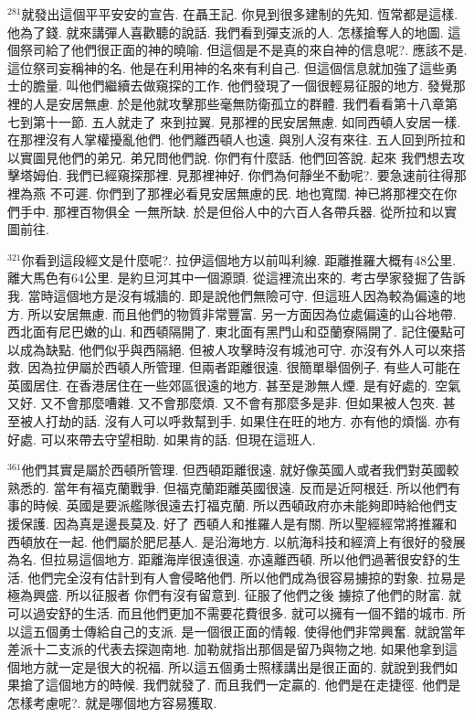 \documentclass{book}
\begin{document}
$^{281}$就發出這個平平安安的宣告.
在聶王記.
你見到很多建制的先知.
恆常都是這樣.
他為了錢.
就來講彈人喜歡聽的說話.
我們看到彈支派的人.
怎樣搶奪人的地圖.
這個祭司給了他們很正面的神的曉喻.
但這個是不是真的來自神的信息呢?.
應該不是.
這位祭司妄稱神的名.
他是在利用神的名來有利自己.
但這個信息就加強了這些勇士的膽量.
叫他們繼續去做窺探的工作.
他們發現了一個很輕易征服的地方.
發覺那裡的人是安居無慮.
於是他就攻擊那些毫無防衛孤立的群體.
我們看看第十八章第七到第十一節.
五人就走了 來到拉翼.
見那裡的民安居無慮.
如同西頓人安居一樣.
在那裡沒有人掌權擾亂他們.
他們離西頓人也遠.
與別人沒有來往.
五人回到所拉和以實圖見他們的弟兄.
弟兄問他們說.
你們有什麼話.
他們回答說.
起來 我們想去攻擊塔姆伯.
我們已經窺探那裡.
見那裡神好.
你們為何靜坐不動呢?.
要急速前往得那裡為燕 不可遲.
你們到了那裡必看見安居無慮的民.
地也寬闊.
神已將那裡交在你們手中.
那裡百物俱全 一無所缺.
於是但俗人中的六百人各帶兵器.
從所拉和以實圖前往.

$^{321}$你看到這段經文是什麼呢?.
拉伊這個地方以前叫利線.
距離推羅大概有48公里.
離大馬色有64公里.
是約旦河其中一個源頭.
從這裡流出來的.
考古學家發掘了告訴我.
當時這個地方是沒有城牆的.
即是說他們無險可守.
但這班人因為較為偏遠的地方.
所以安居無慮.
而且他們的物質非常豐富.
另一方面因為位處偏遠的山谷地帶.
西北面有尼巴嫩的山.
和西頓隔開了.
東北面有黑門山和亞蘭寮隔開了.
記住優點可以成為缺點.
他們似乎與西隔絕.
但被人攻擊時沒有城池可守.
亦沒有外人可以來搭救.
因為拉伊屬於西頓人所管理.
但兩者距離很遠.
很簡單舉個例子.
有些人可能在英國居住.
在香港居住在一些郊區很遠的地方.
甚至是渺無人煙.
是有好處的.
空氣又好.
又不會那麼嘈雜.
又不會那麼煩.
又不會有那麼多是非.
但如果被人包夾.
甚至被人打劫的話.
沒有人可以呼救幫到手.
如果住在旺的地方.
亦有他的煩惱.
亦有好處.
可以來帶去守望相助.
如果肯的話.
但現在這班人.

$^{361}$他們其實是屬於西頓所管理.
但西頓距離很遠.
就好像英國人或者我們對英國較熟悉的.
當年有福克蘭戰爭.
但福克蘭距離英國很遠.
反而是近阿根廷.
所以他們有事的時候.
英國是要派艦隊很遠去打福克蘭.
所以西頓政府亦未能夠即時給他們支援保護.
因為真是邊長莫及.
好了 西頓人和推羅人是有關.
所以聖經經常將推羅和西頓放在一起.
他們屬於肥尼基人.
是沿海地方.
以航海科技和經濟上有很好的發展為名.
但拉易這個地方.
距離海岸很遠很遠.
亦遠離西頓.
所以他們過著很安舒的生活.
他們完全沒有估計到有人會侵略他們.
所以他們成為很容易擄掠的對象.
拉易是極為興盛.
所以征服者 你們有沒有留意到.
征服了他們之後 擄掠了他們的財富.
就可以過安舒的生活.
而且他們更加不需要花費很多.
就可以擁有一個不錯的城市.
所以這五個勇士傳給自己的支派.
是一個很正面的情報.
使得他們非常興奮.
就說當年差派十二支派的代表去探迦南地.
加勒就指出那個是留乃與物之地.
如果他拿到這個地方就一定是很大的祝福.
所以這五個勇士照樣講出是很正面的.
就說到我們如果搶了這個地方的時候.
我們就發了.
而且我們一定贏的.
他們是在走捷徑.
他們是怎樣考慮呢?.
就是哪個地方容易獲取.
\end{document}

